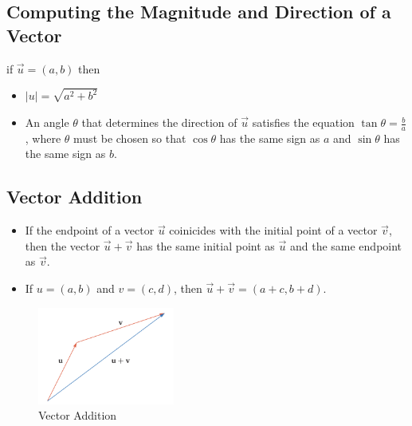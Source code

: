 \subsection{Computing the Magnitude and Direction of a Vector}
if \(\vec u = (a,b)\) then
\begin{itemize}
    \item \(|u| = \sqrt{a^2 + b^2}\)
    \item An angle \(\theta\) that determines the direction of \(\vec{u}\) satisfies the equation \(\tan \theta = \frac{b}{a}\), where \(\theta\) must be chosen so that \(\cos \theta\) has the same sign as \(a\) and \(\sin \theta\) has the same sign as \(b\).
\end{itemize}

\subsection{Vector Addition}
\begin{itemize}
\item If the endpoint of a vector \(\vec u\) coinicides with the initial point of a vector \(\vec v\), then the vector \(\vec u + \vec v\) has the same initial point as \(\vec u\) and the same endpoint as \(\vec v\).
\item If \(u = (a,b)\) and \(v = (c,d)\), then \(\vec u + \vec v = (a+c, b+d)\).
\end{itemize}
\begin{figure}
    \centering
    \includegraphics[width=0.4\textwidth]{pics/vector3.png}
    \caption{Vector Addition}
    \label{fig:vector_addition}
\end{figure}

